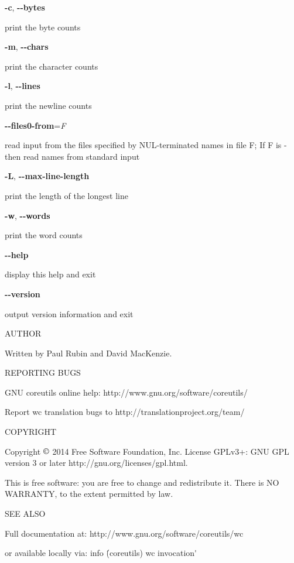 \manoption
{\bf {-}c}, {\bf {-}{-}bytes}

print the byte counts

\manoption
{\bf {-}m}, {\bf {-}{-}chars}

print the character counts

\manoption
{\bf {-}l}, {\bf {-}{-}lines}

print the newline counts

\manoption
{\bf {-}{-}files0{-}from}={\it F\/}

read input from the files specified by
NUL{-}terminated names in file F;
If F is {-} then read names from standard input

\manoption
{\bf {-}L}, {\bf {-}{-}max{-}line{-}length}

print the length of the longest line

\manoption
{\bf {-}w}, {\bf {-}{-}words}

print the word counts

\manoption
{\bf {-}{-}help}

display this help and exit

\manoption
{\bf {-}{-}version}

output version information and exit

\mansection AUTHOR

Written by Paul Rubin and David MacKenzie.

\mansection REPORTING BUGS

GNU coreutils online help: http://www.gnu.org/software/coreutils/
\par

Report wc translation bugs to http://translationproject.org/team/

\mansection COPYRIGHT

Copyright $\copyright$ 2014 Free Software Foundation, Inc.
License GPLv3+: GNU GPL version 3 or later
http://gnu.org/licenses/gpl.html.
\par

This is free software: you are free to change and redistribute it.
There is NO WARRANTY, to the extent permitted by law.

\mansection SEE ALSO

Full documentation at: http://www.gnu.org/software/coreutils/wc
\par
or available locally via: info \'(coreutils) wc invocation\'
\bye

